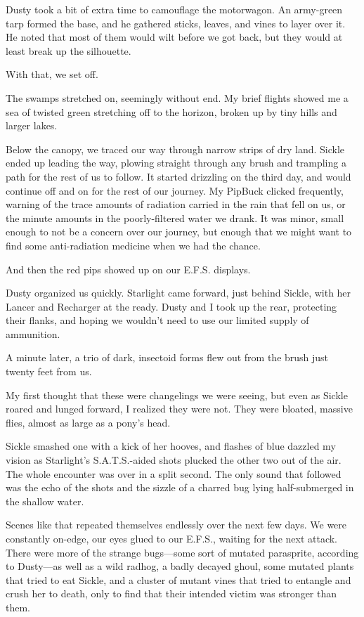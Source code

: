 Dusty took a bit of extra time to camouflage the motorwagon. An army-green tarp formed the base, and he gathered sticks, leaves, and vines to layer over it. He noted that most of them would wilt before we got back, but they would at least break up the silhouette.

With that, we set off.

{\br}%
The swamps stretched on, seemingly without end. My brief flights showed me a sea of twisted green stretching off to the horizon, broken up by tiny hills and larger lakes.

Below the canopy, we traced our way through narrow strips of dry land. Sickle ended up leading the way, plowing straight through any brush and trampling a path for the rest of us to follow. It started drizzling on the third day, and would continue off and on for the rest of our journey. My PipBuck clicked frequently, warning of the trace amounts of radiation carried in the rain that fell on us, or the minute amounts in the poorly-filtered water we drank. It was minor, small enough to not be a concern over our journey, but enough that we might want to find some anti-radiation medicine when we had the chance.

And then the red pips showed up on our E.F.S. displays.

Dusty organized us quickly. Starlight came forward, just behind Sickle, with her Lancer and Recharger at the ready. Dusty and I took up the rear, protecting their flanks, and hoping we wouldn’t need to use our limited supply of ammunition.

A minute later, a trio of dark, insectoid forms flew out from the brush just twenty feet from us.

My first thought that these were changelings we were seeing, but even as Sickle roared and lunged forward, I realized they were not. They were bloated, massive flies, almost as large as a pony’s head.

Sickle smashed one with a kick of her hooves, and flashes of blue dazzled my vision as Starlight’s S.A.T.S.-aided shots plucked the other two out of the air. The whole encounter was over in a split second. The only sound that followed was the echo of the shots and the sizzle of a charred bug lying half-submerged in the shallow water.

Scenes like that repeated themselves endlessly over the next few days. We were constantly on-edge, our eyes glued to our E.F.S., waiting for the next attack. There were more of the strange bugs—some sort of mutated parasprite, according to Dusty—as well as a wild radhog, a badly decayed ghoul, some mutated plants that tried to eat Sickle, and a cluster of mutant vines that tried to entangle and crush her to death, only to find that their intended victim was stronger than them.

